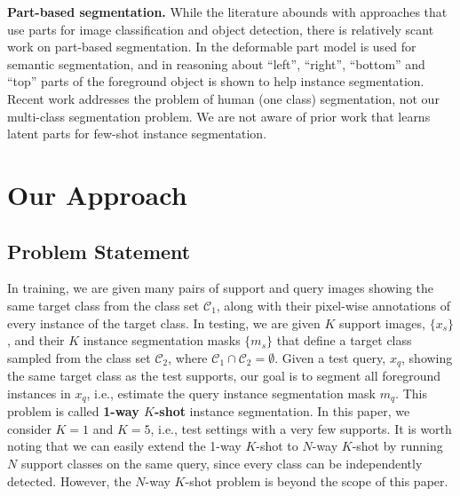 \documentclass[final]{cvpr}
\begin{document}
{\bf Part-based segmentation.} While the literature abounds with approaches that use parts for image classification and object detection, there is relatively scant work on part-based segmentation. In \cite{trulls2014segmentation,girshick2014rich} the deformable part model \cite{DPM_PAMI09} is used for semantic segmentation, and in \cite{liu2017sgn} reasoning about ``left'', ``right'', ``bottom'' and ``top'' parts of the foreground object is shown to help instance segmentation. Recent work \cite{li2017holistic,gong2018instance} addresses the problem of human (one class) segmentation, not our multi-class segmentation problem. We are not aware of prior work that learns latent parts for few-shot instance segmentation.
 
 
 
 
 
\section{Our Approach}
\label{sec:method}


\subsection{Problem Statement}
In training, we are given many pairs of support and query images showing the same target class from the class set $\mathcal{C}_1$, along with their pixel-wise annotations of every instance of the target class. In testing, we are given $K$ support images, $\{x_s\}$, and their $K$ instance segmentation masks $\{m_s\}$ that define a target class sampled from the class set $\mathcal{C}_2$, where $\mathcal{C}_1 \cap \mathcal{C}_2 = \emptyset$. Given a test query, $x_q$, showing the same target class as the test supports, our goal is to segment all foreground instances in $x_q$, i.e., estimate the query instance segmentation mask $m_q$. This problem is called \textbf{1-way $K$-shot} instance segmentation. In this paper, we consider $K=1$ and $K=5$, i.e., test settings with a very few supports.
It is worth noting that we can easily extend the 1-way $K$-shot to $N$-way $K$-shot by running $N$ support classes on the same query, since every class can be independently detected. However, the $N$-way $K$-shot problem is beyond the scope of this paper.
\end{document}

